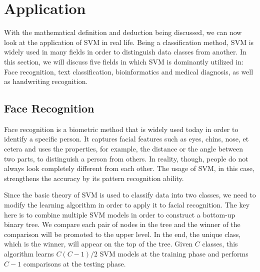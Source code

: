 \section{Application}
With the mathematical definition and deduction being discussed, we can now
look at the application of SVM in real life. Being a classification method,
SVM is widely used in many fields in order to distinguish data classes from
another. In this section, we will discuss five fields in which SVM is dominantly
utilized in: Face recognition, text classification,
bioinformatics and medical diagnosis, as well as handwriting recognition.

\subsection*{Face Recognition}
Face recognition is a biometric method that is widely used today in order
to identify a specific
person. It captures facial features such as eyes, chins, nose, et cetera and
uses the properties, for example, the distance or the angle between two parts, 
to distinguish a person from others. In reality, though, people do not always
look completely different from each other. The usage of SVM, 
in this case, strengthens the accuracy by its pattern recognition ability.

Since the basic theory of SVM is used to classify data into two classes, we
need to modify the learning algorithm in order to apply it to facial
recognition. The key here is to combine multiple SVM models in order
to construct a bottom-up binary tree. We compare each pair of nodes in the
tree and the winner of the comparison will be promoted to the upper level.
In the end, the unique class, which is the winner, will appear on the top of 
the tree. Given $C$ classes, this algorithm learns $C(C-1)/2$ SVM models at
the training phase and performs $C-1$ comparisons at the testing phase.

